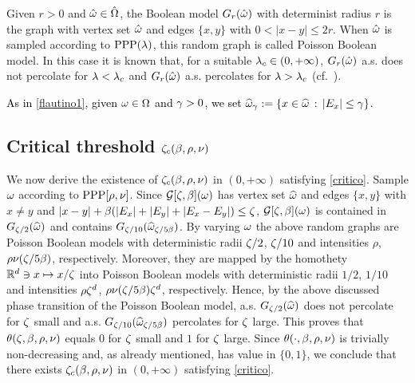 \documentclass[12pt,a4paper,reqno]{amsart}
\newcommand{\cG}{\ensuremath{\mathcal G}}
\newcommand{\bbR}{{\ensuremath{\mathbb R}} }
\let\r=\rho  \let\s=\sigma \let\t=\tau   \let\th=\vartheta
\let\O=\Omega \let\P=\Pi   \let\Ps=\Psi \let\Si=\Sigma \let\X=\Xi
\newcommand{\rosso}{\textcolor{black}} %
\begin{document}
Given $r>0$ and  $\hat \o \in \hat \O$, the Boolean model $G_r(\hat {\omega})$ with determinist radius $r$ is the graph with vertex set $\hat {\omega}$ and edges $\{x,y\}$ with $0<|x-y|\leq 2 r$. When $\hat {\omega}$ is sampled according to ${\rm PPP}(\lambda)$, this random graph is called Poisson Boolean model. In this case 
it is known that, for a suitable $\lambda_c\in (0,+\infty)$, $G_r(\hat {\omega})$  a.s. does not percolate for $\lambda<\lambda_c$ and $G_r(\hat {\omega})$  a.s.   percolates for $\lambda>\lambda_c$  (cf.~\cite{MR}).

 \rosso{As in \eqref{flautino1}, given $\o\in \O$ and $\gamma>0$, we set $\widehat{\omega}_\gamma:=\{x\in \widehat{\omega}\,:\, |E_x|\leq \gamma\}$.}

\subsection{Critical threshold $\z_c (\b,\r,\nu)$}\label{marino} We now derive the existence of $\z_c (\b,\r,\nu)$ in $ (0,+\infty)$ satisfying \eqref{critico}.  Sample $\omega$ according to ${\rm PPP}[\r,\nu]$.
 Since  $\cG [\z,\b](\o)$ has vertex set $\widehat {\omega}$ and edges $\{x,y\}$ with $x\not=y$ and $|x-y|+\beta( |E_x|+|E_y|+|E_x-E_y|) \leq \zeta$,  $\cG [\z,\b](\o)$
 is contained in $G_{\zeta/2}(\widehat{\omega})$ and contains  $G_{\zeta/10}(\widehat{\omega}_{\zeta/5\beta})$. 
 By varying $\omega$ the above random graphs are Poisson Boolean models with deterministic radii $\zeta/2$, $\zeta/10$ and intensities $\rho$, $\rho \nu(\zeta/5\beta)$, respectively.
  Moreover, they are mapped by the homothety  $\bbR^d\ni x\mapsto x/\z$ into Poisson Boolean models with deterministic radii $1/2$, $1/10$ and intensities $\rho \zeta^d $, $\rho \nu(\zeta/5 \beta)\zeta^d$, respectively. Hence, by the above  discussed phase transition of the Poisson Boolean model, a.s. $G_{\zeta/2}(\widehat{\omega})$ does not percolate for $\zeta$ small and  a.s.  $G_{\zeta/10}(\widehat{\omega}_{\zeta/5\beta})$ percolates for $\zeta$ large. 
 This proves that $\theta(\zeta,\beta, \rho, \nu)$ 
 equals $0$  for $\zeta$ small and $1$ for $\zeta$ large.  
 Since  $\theta(\cdot,\beta, \rho, \nu)$ is trivially non-decreasing and, as already mentioned, has value in $\{0,1\}$, we conclude that there exists  $\z_c (\b,\r,\nu)$ in $ (0,+\infty)$ satisfying \eqref{critico}. 
 
\end{document}
